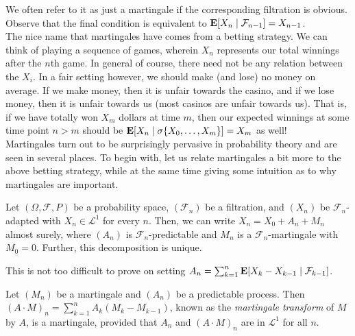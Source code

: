 We often refer to it as just a martingale if the corresponding filtration is obvious.\\
Observe that the final condition is equivalent to $\textbf{E}[X_n\mid\mathcal{F}_{n-1}] = X_{n-1}$.\\
The nice name that martingales have comes from a betting strategy. We can think of playing a sequence of games, wherein $X_n$ represents our total winnings after the $n$th game. In general of course, there need not be any relation between the $X_i$. In a fair setting however, we should make (and lose) no money on average. If we make money, then it is unfair towards the casino, and if we lose money, then it is unfair towards us (most casinos are unfair towards us). That is, if we have totally won $X_m$ dollars at time $m$, then our expected winnings at some time point $n>m$ should be $\textbf{E}[X_n \mid \sigma\{X_0,\ldots,X_m\}] = X_m$ as well!\\
Martingales turn out to be surprisingly pervasive in probability theory and are seen in several places. To begin with, let us relate martingales a bit more to the above betting strategy, while at the same time giving some intuition as to why martingales are important.

\begin{lemma}
	\label{doob decomposition}
	Let $(\Omega,\mathcal{F},P)$ be a probability space, $(\mathcal{F}_n)$ be a filtration, and $(X_n)$ be $\mathcal{F}_n$-adapted with $X_n\in\mathcal{L}^1$ for every $n$. Then, we can write $X_n = X_0 + A_n + M_n$ almost surely, where $(A_n)$ is $\mathcal{F}_n$-predictable and $M_n$ is a $\mathcal{F}_n$-martingale with $M_0=0$. Further, this decomposition is unique.
\end{lemma}

This is not too difficult to prove on setting $A_n = \sum_{k=1}^n \textbf{E}[X_k - X_{k-1} \mid \mathcal{F}_{k-1}]$.

\begin{definition}
	Let $(M_n)$ be a martingale and $(A_n)$ be a predictable process. Then $(A\cdot M)_n = \sum_{k=1}^n A_k (M_k - M_{k-1})$, known as the \textit{martingale transform} of $M$ by $A$, is a martingale, provided that $A_n$ and $(A\cdot M)_n$ are in $\mathcal{L}^1$ for all $n$.
\end{definition}

